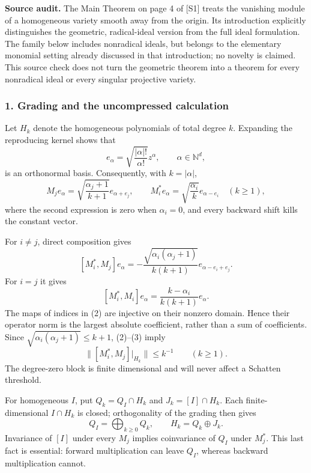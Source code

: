 \documentclass[11pt]{article}
\begin{document}
\textbf{Source audit.} The Main Theorem on page 4 of [S1] treats the vanishing module of a homogeneous variety smooth away from the origin. Its introduction explicitly distinguishes the geometric, radical-ideal version from the full ideal formulation. The family below includes nonradical ideals, but belongs to the elementary monomial setting already discussed in that introduction; no novelty is claimed. This source check does not turn the geometric theorem into a theorem for every nonradical ideal or every singular projective variety.

\subsubsection{1. Grading and the uncompressed calculation}
Let $H_k$ denote the homogeneous polynomials of total degree $k$. Expanding the reproducing kernel shows that
\[
 e_\alpha=\sqrt{\frac{|\alpha|!}{\alpha!}}z^\alpha,
 \qquad \alpha\in\mathbb N^d,
\]
is an orthonormal basis. Consequently, with $k=|\alpha|$,
\[
 M_j e_\alpha=\sqrt{\frac{\alpha_j+1}{k+1}}e_{\alpha+e_j},
 \qquad
 M_i^*e_\alpha=\sqrt{\frac{\alpha_i}{k}}e_{\alpha-e_i}\quad(k\geq1),
                                                               \tag{1}
\]
where the second expression is zero when $\alpha_i=0$, and every backward shift kills the constant vector.

For $i\ne j$, direct composition gives
\[
 [M_i^*,M_j]e_\alpha
 =-\frac{\sqrt{\alpha_i(\alpha_j+1)}}{k(k+1)}
       e_{\alpha-e_i+e_j}.                                  \tag{2}
\]
For $i=j$ it gives
\[
 [M_i^*,M_i]e_\alpha=\frac{k-\alpha_i}{k(k+1)}e_\alpha.
                                                               \tag{3}
\]
The maps of indices in (2) are injective on their nonzero domain. Hence their operator norm is the largest absolute coefficient, rather than a sum of coefficients. Since $\sqrt{\alpha_i(\alpha_j+1)}\leq k+1$, (2)--(3) imply
\[
 \|[M_i^*,M_j]|_{H_k}\|\leq k^{-1}\qquad(k\geq1).           \tag{4}
\]
The degree-zero block is finite dimensional and will never affect a Schatten threshold.

For homogeneous $I$, put $Q_k=Q_I\cap H_k$ and $J_k=[I]\cap H_k$. Each finite-dimensional $I\cap H_k$ is closed; orthogonality of the grading then gives
\[
 Q_I=\bigoplus_{k\geq0}Q_k,\qquad H_k=Q_k\oplus J_k.
\]
Invariance of $[I]$ under every $M_j$ implies coinvariance of $Q_I$ under $M_j^*$. This last fact is essential: forward multiplication can leave $Q_I$, whereas backward multiplication cannot.
\end{document}
